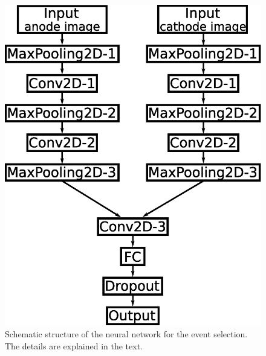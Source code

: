 \documentclass{jps-cp}
\begin{document}
\vspace{0zw}
\begin{figure}
  \centering
  \begin{minipage}{0.4\columnwidth}
    \centering
    \includegraphics[clip, width=0.9\columnwidth]{eps/event_selection_v2.eps}
    \caption{Schematic structure of the neural network for the event selection.
      The details are explained in the text.}
    \label{fig:selection}
  \end{minipage}
  \hfill
  \begin{minipage}{0.4\columnwidth}
    \centering

\end{minipage}
\end{figure}
\end{document}
